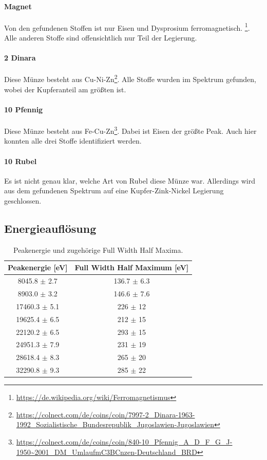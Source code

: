 \documentclass[12pt,a4paper]{article}
\begin{document}
\paragraph{Magnet}
Von den gefundenen Stoffen ist nur Eisen und Dysprosium ferromagnetisch. \footnote{\url{https://de.wikipedia.org/wiki/Ferromagnetismus}}. Alle anderen Stoffe sind offensichtlich nur Teil der Legierung.

\paragraph{2 Dinara}
Diese Münze besteht aus Cu-Ni-Zn\footnote{\url{https://colnect.com/de/coins/coin/7997-2_Dinara-1963-1992_Sozialistische_Bundesrepublik_Jugoslawien-Jugoslawien}}. Alle Stoffe wurden im Spektrum gefunden, wobei der Kupferanteil am größten ist.

\paragraph{10 Pfennig}
Diese Münze besteht aus Fe-Cu-Zn\footnote{\url{https://colnect.com/de/coins/coin/840-10_Pfennig_A_D_F_G_J-1950~2001_DM_UmlaufmC3BCnzen-Deutschland_BRD}}. Dabei ist Eisen der größte Peak. Auch hier konnten alle drei Stoffe identifiziert werden.

\paragraph{10 Rubel}
Es ist nicht genau klar, welche Art von Rubel diese Münze war. Allerdings wird aus dem gefundenen Spektrum auf eine Kupfer-Zink-Nickel Legierung geschlossen.

\subsection{Energieauflösung}

\begin{table}
\centering
\begin{tabular}{|c|c|}
\hline 
Peakenergie [\si{eV}] & Full Width Half Maximum [\si{eV}] \\ 
\hline 
8045.8 $\pm$ 2.7 & 136.7 $\pm$ 6.3 \\ 
\hline
8903.0 $\pm$ 3.2 & 146.6 $\pm$ 7.6 \\ 
\hline
17460.3 $\pm$ 5.1 & 226 $\pm$ 12 \\ 
\hline
19625.4 $\pm$ 6.5 & 212 $\pm$ 15 \\ 
\hline
22120.2 $\pm$ 6.5 & 293 $\pm$ 15 \\ 
\hline
24951.3 $\pm$ 7.9 & 231 $\pm$ 19 \\ 
\hline
28618.4 $\pm$ 8.3 & 265 $\pm$ 20 \\ 
\hline
32290.8 $\pm$ 9.3 & 285 $\pm$ 22 \\ 
\hline
\end{tabular} 
\caption{Peakenergie und zugehörige Full Width Half Maxima.}
\label{tab:roentgen_energieaufloesung}
\end{table}
\end{document}
